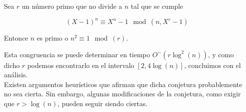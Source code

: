 \begin{conjetura}\label{conjetura_aks}
	Sea $r$ un número primo que no divide a $n$ tal que se cumple
	
	\begin{equation}
	(X - 1)^n \equiv X^n - 1 \mod(n, X^r - 1)
	\end{equation}
	
	Entonce $n$ es primo o $n^2 \equiv 1 \mod(r)$.
\end{conjetura}

Esta congruencia se puede determinar en tiempo $O^\sim(r\log^2(n))$, y como dicho $r$ podemos encontrarlo en el intervalo $[2, 4\log(n)]$, concluimos con el análisis.\\

Existen argumentos heurísticos \cite{50a} que afirman que dicha conjetura probablemente no sea cierta. Sin embargo, algunas modificaciones de la conjetura, como exigir que $r > \log(n)$, pueden seguir siendo ciertas.

\endinput
